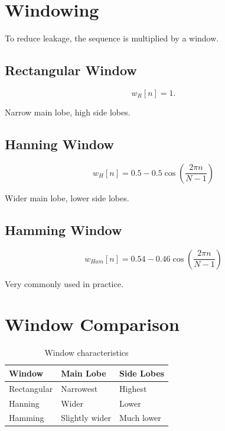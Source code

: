 \section{Windowing}

To reduce leakage, the sequence is multiplied by a window.


\subsection{Rectangular Window}

\[
w_R[n]=1.
\]

Narrow main lobe, high side lobes.


\subsection{Hanning Window}

\[
\boxed{
w_H[n]=
0.5-0.5\cos\left(\frac{2\pi n}{N-1}\right)
}
\]

Wider main lobe, lower side lobes.


\subsection{Hamming Window}

\[
\boxed{
w_{Ham}[n]=
0.54-0.46\cos\left(\frac{2\pi n}{N-1}\right)
}
\]

Very commonly used in practice.


\section{Window Comparison}

\begin{table}[H]
\centering
\caption{Window characteristics}
\begin{tabular}{|p{4cm}|p{3cm}|p{4cm}|}
\hline
\textbf{Window} & \textbf{Main Lobe} & \textbf{Side Lobes}\\
\hline
Rectangular & Narrowest & Highest\\
\hline
Hanning & Wider & Lower\\
\hline
Hamming & Slightly wider & Much lower\\
\hline
\end{tabular}
\end{table}

